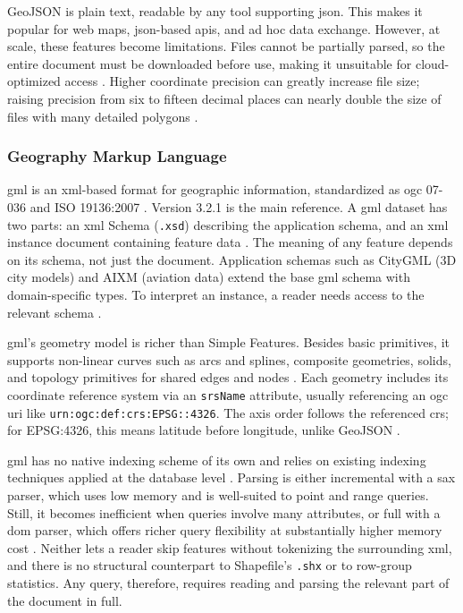 GeoJSON is plain text, readable by any tool supporting \acrshort{json}. This makes it popular for web maps, \acrshort{json}-based \acrshort{api}s, and ad hoc data exchange. However, at scale, these features become limitations. Files cannot be partially parsed, so the entire document must be downloaded before use, making it unsuitable for cloud-optimized access \parencite{cngfoundation2024_cloud_optimized_geospatial_formats_guide}. Higher coordinate precision can greatly increase file size; raising precision from six to fifteen decimal places can nearly double the size of files with many detailed polygons \parencite{butler2016_rfc7946_geojson_format}.

\subsubsection{Geography Markup Language}
\acrfull{gml} is an \acrshort{xml}-based format for geographic information, standardized as \acrshort{ogc} 07-036 and ISO 19136:2007 \parencite{ogc2007_07036_gml_specification}. Version 3.2.1 is the main reference. A \acrshort{gml} dataset has two parts: an \acrshort{xml} Schema (\texttt{.xsd}) describing the application schema, and an \acrshort{xml} instance document containing feature data \parencite{ogc2007_07036_gml_specification}. The meaning of any feature depends on its schema, not just the document. Application schemas such as CityGML (3D city models) and AIXM (aviation data) extend the base \acrshort{gml} schema with domain-specific types. To interpret an instance, a reader needs access to the relevant schema \parencite{wikipedia2026_geography_markup_language}.

\acrshort{gml}'s geometry model is richer than Simple Features. Besides basic primitives, it supports non-linear curves such as arcs and splines, composite geometries, solids, and topology primitives for shared edges and nodes \parencite{ogc2007_07036_gml_specification}. Each geometry includes its coordinate reference system via an \texttt{srsName} attribute, usually referencing an \acrshort{ogc} \acrshort{uri} like \texttt{urn:ogc:def:crs:EPSG::4326}. The axis order follows the referenced \acrshort{crs}; for EPSG:4326, this means latitude before longitude, unlike GeoJSON \parencite{gdal2025_gml_driver}.

\acrshort{gml} has no native indexing scheme of its own and relies on existing indexing techniques applied at the database level \parencite{lu2005_advances_in_gml_geospatial_applications}. Parsing is either incremental with a \acrshort{sax} parser, which uses low memory and is well-suited to point and range queries. Still, it becomes inefficient when queries involve many attributes, or full with a \acrshort{dom} parser, which offers richer query flexibility at substantially higher memory cost \parencite{lu2005_advances_in_gml_geospatial_applications}. Neither lets a reader skip features without tokenizing the surrounding \acrshort{xml}, and there is no structural counterpart to Shapefile's \texttt{.shx} or to row-group statistics. Any query, therefore, requires reading and parsing the relevant part of the document in full.

